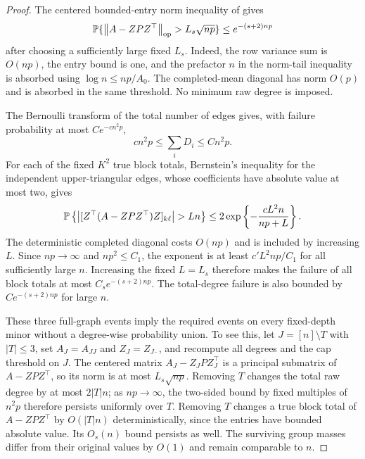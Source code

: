 \begin{proof}
The centered bounded-entry norm inequality of \citet[Corollary 3.12 and Remark 3.13]{bvh} gives
\[
 \mathbb P\{\left\lVert A-{ZPZ^\top}\right\rVert_{\mathrm{op}}>L_s\sqrt {np}\}
 \le e^{-(s+2){np}}
\]
after choosing a sufficiently large fixed $L_s$. Indeed, the row
variance sum is $O({np})$, the entry bound is one, and the prefactor $n$
in the norm-tail inequality is absorbed using $\log n\le {np}/A_0$.
The completed-mean diagonal has norm $O(p)$ and is absorbed in the
same threshold. No minimum raw degree is imposed.

The Bernoulli transform of the total number of edges gives, with
failure probability at most $Ce^{-c{n^2p}}$,
\[
 c{n^2p}\le\sum_iD_i\le C{n^2p}.
\]
For each of the fixed $K^2$ true block totals, Bernstein's inequality
for the independent upper-triangular edges, whose coefficients have
absolute value at most two, gives
\[
 \PP\left\{\left|[Z^\top(A-{ZPZ^\top})Z]_{k\ell}\right|>Ln\right\}
 \le 2\exp\left\{-\frac{cL^2n}{{np}+L}\right\}.
\]
The deterministic completed diagonal costs $O({np})$ and is included
by increasing $L$. Since ${np}\to\infty$ and $np^2\le C_1$,
the exponent is at least $c'L^2{np}/C_1$ for all sufficiently large $n$.
Increasing the fixed $L=L_s$ therefore makes the failure of all block
totals at most $C_se^{-(s+2){np}}$. The total-degree failure is also
bounded by $Ce^{-(s+2){np}}$ for large $n$.

These three full-graph events imply the required events on every
fixed-depth minor without a degree-wise probability union. To see this,
let $J=[n]\setminus T$ with $|T|\le3$, set $A_J=A_{JJ}$ and
$Z_J=Z_{J\cdot}$, and recompute all degrees and the cap
threshold on $J$. The centered matrix $A_J-{Z_JPZ_J^\top}$ is a principal
submatrix of $A-{ZPZ^\top}$, so its norm is at most $L_s\sqrt {np}$.
Removing $T$ changes the total raw degree by at most $2|T|n$;
as ${np}\to\infty$, the two-sided bound by fixed multiples of ${n^2p}$
therefore persists uniformly over $T$. Removing $T$ changes a true
block total of $A-{ZPZ^\top}$ by $O(|T|n)$ deterministically, since
the entries have bounded absolute value. Its $O_s(n)$ bound persists
as well. The surviving group masses differ from their original
values by $O(1)$ and remain comparable to $n$.


\end{proof}
